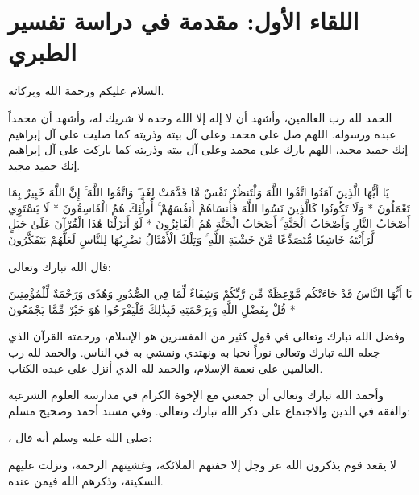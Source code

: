 \chapter{اللقاء الأول: مقدمة في دراسة تفسير الطبري}

السلام عليكم ورحمة الله وبركاته.

الحمد لله رب العالمين، وأشهد أن لا إله إلا الله وحده لا شريك له، وأشهد أن محمداً عبده ورسوله. اللهم صل على محمد وعلى آل بيته وذريته كما صليت على آل إبراهيم إنك حميد مجيد، اللهم بارك على محمد وعلى آل بيته وذريته كما باركت على آل إبراهيم إنك حميد مجيد.

\begin{ayah}
يَا أَيُّهَا الَّذِينَ آمَنُوا اتَّقُوا اللَّهَ وَلْتَنظُرْ نَفْسٌ مَّا قَدَّمَتْ لِغَدٍ ۖ وَاتَّقُوا اللَّهَ ۚ إِنَّ اللَّهَ خَبِيرٌ بِمَا تَعْمَلُونَ * وَلَا تَكُونُوا كَالَّذِينَ نَسُوا اللَّهَ فَأَنسَاهُمْ أَنفُسَهُمْ ۚ أُولَٰئِكَ هُمُ الْفَاسِقُونَ * لَا يَسْتَوِي أَصْحَابُ النَّارِ وَأَصْحَابُ الْجَنَّةِ ۚ أَصْحَابُ الْجَنَّةِ هُمُ الْفَائِزُونَ * لَوْ أَنزَلْنَا هَٰذَا الْقُرْآنَ عَلَىٰ جَبَلٍ لَّرَأَيْتَهُ خَاشِعًا مُّتَصَدِّعًا مِّنْ خَشْيَةِ اللَّهِ ۚ وَتِلْكَ الْأَمْثَالُ نَضْرِبُهَا لِلنَّاسِ لَعَلَّهُمْ يَتَفَكَّرُونَ
\end{ayah}

قال الله تبارك وتعالى:
\begin{ayah}
يَا أَيُّهَا النَّاسُ قَدْ جَاءَتْكُم مَّوْعِظَةٌ مِّن رَّبِّكُمْ وَشِفَاءٌ لِّمَا فِي الصُّدُورِ وَهُدًى وَرَحْمَةٌ لِّلْمُؤْمِنِينَ * قُلْ بِفَضْلِ اللَّهِ وَبِرَحْمَتِهِ فَبِذَٰلِكَ فَلْيَفْرَحُوا هُوَ خَيْرٌ مِّمَّا يَجْمَعُونَ
\end{ayah}

وفضل الله تبارك وتعالى في قول كثير من المفسرين هو الإسلام، ورحمته القرآن الذي جعله الله تبارك وتعالى نوراً نحيا به ونهتدي ونمشي به في الناس. والحمد لله رب العالمين على نعمة الإسلام، والحمد لله الذي أنزل على عبده الكتاب. 

وأحمد الله تبارك وتعالى أن جمعني مع الإخوة الكرام في مدارسة العلوم الشرعية والفقه في الدين والاجتماع على ذكر الله تبارك وتعالى. وفي مسند أحمد وصحيح مسلم:

\begin{hadith}
   ،     صلى الله عليه وسلم أنه قال:

لا يقعد قوم يذكرون الله عز وجل إلا حفتهم الملائكة، وغشيتهم الرحمة، ونزلت عليهم السكينة، وذكرهم الله فيمن عنده.
\end{hadith}

